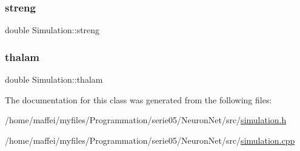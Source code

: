 \mbox{\label{classSimulation_adfda098679d8fcb864ecd87409087d02}} 
\subsubsection{\texorpdfstring{streng}{streng}}
{\footnotesize\ttfamily double Simulation\+::streng\hspace{0.3cm}{\ttfamily [private]}}

\mbox{\label{classSimulation_a7fca2f5f79a662f91736b0e5f30598c1}} 
\subsubsection{\texorpdfstring{thalam}{thalam}}
{\footnotesize\ttfamily double Simulation\+::thalam\hspace{0.3cm}{\ttfamily [private]}}



The documentation for this class was generated from the following files\+:\begin{DoxyCompactItemize}
\item 
/home/maffei/myfiles/\+Programmation/serie05/\+Neuron\+Net/src/\hyperlink{simulation_8h}{simulation.\+h}\item 
/home/maffei/myfiles/\+Programmation/serie05/\+Neuron\+Net/src/\hyperlink{simulation_8cpp}{simulation.\+cpp}\end{DoxyCompactItemize}
